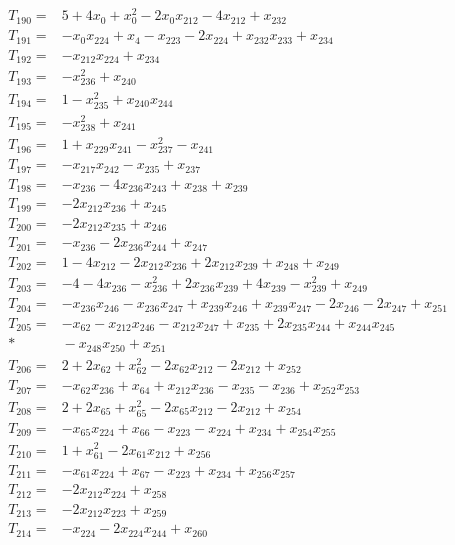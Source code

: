 \begin{align*}
T_{190}={}&5+4x_{0}+x_{0}^{2}-2x_{0}x_{212}-4x_{212}+x_{232}\\[3pt]
T_{191}={}&-x_{0}x_{224}+x_{4}-x_{223}-2x_{224}+x_{232}x_{233}+x_{234}\\[3pt]
T_{192}={}&-x_{212}x_{224}+x_{234}\\[3pt]
T_{193}={}&-x_{236}^{2}+x_{240}\\[3pt]
T_{194}={}&1-x_{235}^{2}+x_{240}x_{244}\\[3pt]
T_{195}={}&-x_{238}^{2}+x_{241}\\[3pt]
T_{196}={}&1+x_{229}x_{241}-x_{237}^{2}-x_{241}\\[3pt]
T_{197}={}&-x_{217}x_{242}-x_{235}+x_{237}\\[3pt]
T_{198}={}&-x_{236}-4x_{236}x_{243}+x_{238}+x_{239}\\[3pt]
T_{199}={}&-2x_{212}x_{236}+x_{245}\\[3pt]
T_{200}={}&-2x_{212}x_{235}+x_{246}\\[3pt]
T_{201}={}&-x_{236}-2x_{236}x_{244}+x_{247}\\[3pt]
T_{202}={}&1-4x_{212}-2x_{212}x_{236}+2x_{212}x_{239}+x_{248}+x_{249}\\[3pt]
T_{203}={}&-4-4x_{236}-x_{236}^{2}+2x_{236}x_{239}+4x_{239}-x_{239}^{2}+x_{249}\\[3pt]
T_{204}={}&-x_{236}x_{246}-x_{236}x_{247}+x_{239}x_{246}+x_{239}x_{247}-2x_{246}-2x_{247}+x_{251}\\[3pt]
T_{205}={}&-x_{62}-x_{212}x_{246}-x_{212}x_{247}+x_{235}+2x_{235}x_{244}+x_{244}x_{245}\\*
&{}-x_{248}x_{250}+x_{251}\\[3pt]
T_{206}={}&2+2x_{62}+x_{62}^{2}-2x_{62}x_{212}-2x_{212}+x_{252}\\[3pt]
T_{207}={}&-x_{62}x_{236}+x_{64}+x_{212}x_{236}-x_{235}-x_{236}+x_{252}x_{253}\\[3pt]
T_{208}={}&2+2x_{65}+x_{65}^{2}-2x_{65}x_{212}-2x_{212}+x_{254}\\[3pt]
T_{209}={}&-x_{65}x_{224}+x_{66}-x_{223}-x_{224}+x_{234}+x_{254}x_{255}\\[3pt]
T_{210}={}&1+x_{61}^{2}-2x_{61}x_{212}+x_{256}\\[3pt]
T_{211}={}&-x_{61}x_{224}+x_{67}-x_{223}+x_{234}+x_{256}x_{257}\\[3pt]
T_{212}={}&-2x_{212}x_{224}+x_{258}\\[3pt]
T_{213}={}&-2x_{212}x_{223}+x_{259}\\[3pt]
T_{214}={}&-x_{224}-2x_{224}x_{244}+x_{260}\\[3pt]

\end{align*}
